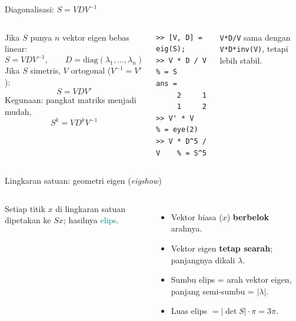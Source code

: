 \documentclass[aspectratio=169,11pt]{beamer}
\begin{document}
\begin{frame}[fragile]{Diagonalisasi: $S = VDV^{-1}$}
\begin{columns}[T]
\small
Jika $S$ punya $n$ vektor eigen bebas linear:
\[
S = V D V^{-1},\qquad D = \mathrm{diag}(\lambda_1,\dots,\lambda_n)
\]
Jika $S$ simetris, $V$ ortogonal ($V^{-1}=V'$):
\[
S = V D V'
\]
Kegunaan: pangkat matriks menjadi mudah,
\[
S^k = V D^k V^{-1}
\]
\begin{lstlisting}[basicstyle=\ttfamily\footnotesize]
>> [V, D] = eig(S);
>> V * D / V      % = S
ans =
     2     1
     1     2
>> V' * V         % = eye(2)
>> V * D^5 / V    % = S^5
\end{lstlisting}
\small \texttt{V*D/V} sama dengan \texttt{V*D*inv(V)}, tetapi lebih stabil.
\end{columns}
\end{frame}

\begin{frame}[fragile]{Lingkaran satuan: geometri eigen (\emph{eigshow})}
\begin{columns}[c]
\centering
{}
\small
Setiap titik $x$ di \alert{lingkaran satuan} dipetakan ke $Sx$; hasilnya
\textcolor{teal}{elips}.
\begin{itemize}
  \item Vektor biasa ($x$) \textbf{berbelok} arahnya.
  \item Vektor eigen \textbf{tetap searah}; panjangnya dikali $\lambda$.
  \item Sumbu elips = arah vektor eigen, panjang semi-sumbu = $|\lambda|$.
  \item Luas elips $= |\det S|\cdot\pi = 3\pi$.
\end{itemize}
\end{columns}
\end{frame}
\end{document}
